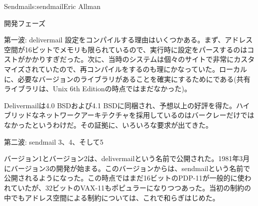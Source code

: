 \begin{aosachapter}{Sendmail}{s:sendmail}{Eric Allman}
\begin{aosasect1}{開発フェーズ}
\begin{aosasect2}{第一波: delivermail}
設定をコンパイルする理由はいくつかある。まず、アドレス空間が16ビットでメモリも限られているので、実行時に設定をパースするのはコストがかかりすぎだった。次に、当時のシステムは個々のサイトで非常にカスタマイズされていたので、再コンパイルをするのも理にかなっていた。ローカルに、必要なバージョンのライブラリがあることを確実にするためにである(共有ライブラリは、Unix 6th Editionの時点ではまだなかった)。

Delivermailは4.0 BSDおよび4.1 BSDに同梱され、予想以上の好評を得た。ハイブリッドなネットワークアーキテクチャを採用しているのはバークレーだけではなかったというわけだ。その証拠に、いろいろな要求が出てきた。

\end{aosasect2}

\begin{aosasect2}{第二波: sendmail 3、4、そして5}

バージョン1とバージョン2は、delivermailという名前で公開された。1981年3月にバージョン3の開発が始まる。このバージョンからは、sendmailという名前で公開されるようになった。この時点ではまだ16ビットのPDP-11が一般的に使われていたが、32ビットのVAX-11もポピュラーになりつつあった。当初の制約の中でもアドレス空間による制約については、これで和らぎはじめた。


\end{aosasect2}
\end{aosasect1}
\end{aosachapter}
